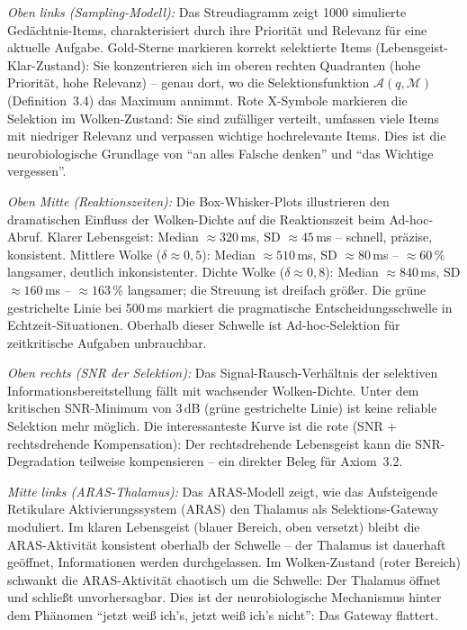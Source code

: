 ﻿\documentclass[12pt,a4paper]{report}
\theoremstyle{plain}
\theoremstyle{definition}
\theoremstyle{remark}
\begin{document}
	\textit{Oben links (Sampling-Modell):}
	Das Streudiagramm zeigt 1000 simulierte Gedächtnis-Items, charakterisiert
	durch ihre Priorität und Relevanz für eine aktuelle Aufgabe.
	Gold-Sterne markieren korrekt selektierte Items (Lebensgeist-Klar-Zustand):
	Sie konzentrieren sich im oberen rechten Quadranten (hohe Priorität,
	hohe Relevanz) -- genau dort, wo die Selektionsfunktion $\mathcal{A}(q,\mathcal{M})$
	(Definition~3.4) das Maximum annimmt.
	Rote X-Symbole markieren die Selektion im Wolken-Zustand: Sie sind zufälliger
	verteilt, umfassen viele Items mit niedriger Relevanz und verpassen wichtige
	hochrelevante Items. Dies ist die neurobiologische Grundlage von
	``an alles Falsche denken'' und ``das Wichtige vergessen''.

	\textit{Oben Mitte (Reaktionszeiten):}
	Die Box-Whisker-Plots illustrieren den dramatischen Einfluss der Wolken-Dichte
	auf die Reaktionszeit beim Ad-hoc-Abruf.
	Klarer Lebensgeist: Median $\approx 320$\,ms, SD $\approx 45$\,ms --
	schnell, präzise, konsistent.
	Mittlere Wolke ($\delta \approx 0{,}5$): Median $\approx 510$\,ms, SD $\approx 80$\,ms --
	$\approx 60\,\%$ langsamer, deutlich inkonsistenter.
	Dichte Wolke ($\delta \approx 0{,}8$): Median $\approx 840$\,ms, SD $\approx 160$\,ms --
	$\approx 163\,\%$ langsamer; die Streuung ist dreifach grö\ss{}er.
	Die grüne gestrichelte Linie bei 500\,ms markiert die pragmatische
	Entscheidungsschwelle in Echtzeit-Situationen. Oberhalb dieser Schwelle
	ist Ad-hoc-Selektion für zeitkritische Aufgaben unbrauchbar.

	\textit{Oben rechts (SNR der Selektion):}
	Das Signal-Rausch-Verhältnis der selektiven Informationsbereitstellung
	fällt mit wachsender Wolken-Dichte. Unter dem kritischen SNR-Minimum
	von 3\,dB (grüne gestrichelte Linie) ist keine reliable Selektion mehr
	möglich. Die interessanteste Kurve ist die rote (SNR + rechtsdrehende
	Kompensation): Der rechtsdrehende Lebensgeist kann die SNR-Degradation
	teilweise kompensieren -- ein direkter Beleg für Axiom~3.2.

	\textit{Mitte links (ARAS-Thalamus):}
	Das ARAS-Modell zeigt, wie das Aufsteigende Retikulare Aktivierungssystem
	(ARAS) den Thalamus als Selektions-Gateway moduliert.
	Im klaren Lebensgeist (blauer Bereich, oben versetzt) bleibt die ARAS-Aktivität
	konsistent oberhalb der Schwelle -- der Thalamus ist dauerhaft geöffnet,
	Informationen werden durchgelassen.
	Im Wolken-Zustand (roter Bereich) schwankt die ARAS-Aktivität chaotisch
	um die Schwelle: Der Thalamus öffnet und schlie\ss{}t unvorhersagbar.
	Dies ist der neurobiologische Mechanismus hinter dem Phänomen
	``jetzt wei\ss{} ich's, jetzt wei\ss{} ich's nicht'': Das Gateway flattert.
\end{document}
